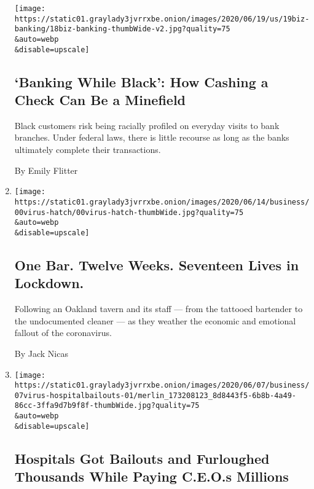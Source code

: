 \begin{enumerate}
  \texttt{[image: https://static01.graylady3jvrrxbe.onion/images/2020/06/19/us/19biz-banking/18biz-banking-thumbWide-v2.jpg?quality=75\\\&auto=webp\\\&disable=upscale]}

  \hypertarget{banking-while-black-how-cashing-a-check-can-be-a-minefield}{%
  \subsection{`Banking While Black': How Cashing a Check Can Be a
  Minefield}\label{banking-while-black-how-cashing-a-check-can-be-a-minefield}}

  Black customers risk being racially profiled on everyday visits to
  bank branches. Under federal laws, there is little recourse as long as
  the banks ultimately complete their transactions.

  By Emily Flitter
\item
  \href{/2020/06/11/business/coronavirus-california-lockdown-small-business.html}{}

  \texttt{[image: https://static01.graylady3jvrrxbe.onion/images/2020/06/14/business/00virus-hatch/00virus-hatch-thumbWide.jpg?quality=75\\\&auto=webp\\\&disable=upscale]}

  \hypertarget{one-bar-twelve-weeks-seventeen-lives-in-lockdown}{%
  \subsection{One Bar. Twelve Weeks. Seventeen Lives in
  Lockdown.}\label{one-bar-twelve-weeks-seventeen-lives-in-lockdown}}

  Following an Oakland tavern and its staff --- from the tattooed
  bartender to the undocumented cleaner --- as they weather the economic
  and emotional fallout of the coronavirus.

  By Jack Nicas
\item
  \href{/2020/06/08/business/hospitals-bailouts-ceo-pay.html}{}

  \texttt{[image: https://static01.graylady3jvrrxbe.onion/images/2020/06/07/business/07virus-hospitalbailouts-01/merlin\_173208123\_8d8443f5-6b8b-4a49-86cc-3ffa9d7b9f8f-thumbWide.jpg?quality=75\\\&auto=webp\\\&disable=upscale]}

  \hypertarget{hospitals-got-bailouts-and-furloughed-thousands-while-paying-ceos-millions}{%
  \subsection{Hospitals Got Bailouts and Furloughed Thousands While
  Paying C.E.O.s
  Millions}\label{hospitals-got-bailouts-and-furloughed-thousands-while-paying-ceos-millions}}


\end{enumerate}
